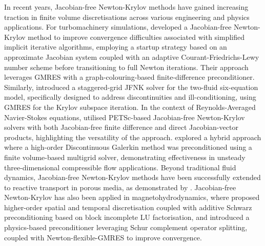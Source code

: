 \documentclass[sn-mathphys,Numbered]{sn-jnl}%
\begin{document}
In recent years, Jacobian-free Newton-Krylov methods have gained increasing traction in finite volume discretisations across various engineering and physics applications.
For turbomachinery simulations, \citet{Zhang2024} developed a Jacobian-free Newton-Krylov method to improve convergence difficulties associated with simplified implicit iterative algorithms, employing a startup strategy based on an approximate Jacobian system coupled with an adaptive Courant-Friedrichs-Lewy number scheme before transitioning to full Newton iterations.
Their approach leverages GMRES with a graph-colouring-based finite-difference preconditioner.
Similarly, \citet{Zhang2024twofluid} introduced a staggered-grid JFNK solver for the two-fluid six-equation model, specifically designed to address discontinuities and ill-conditioning, using GMRES for the Krylov subspace iteration.
In the context of Reynolds-Averaged Navier-Stokes equations, \citet{Sukas2025} utilised PETSc-based \citep{PETSc} Jacobian-free Newton-Krylov solvers with both Jacobian-free finite difference and direct Jacobian-vector products, highlighting the versatility of the approach.
\citet{Johannes2021} explored a hybrid approach where a high-order Discontinuous Galerkin method was preconditioned using a finite volume-based multigrid solver, demonstrating effectiveness in unsteady three-dimensional compressible flow applications.
Beyond traditional fluid dynamics, Jacobian-free Newton-Krylov methods have been successfully extended to reactive transport in porous media, as demonstrated by \citet{Amir2021}.
Jacobian-free Newton-Krylov has also been applied in magnetohydrodynamics, where 
\citet{Nguyen2022} proposed higher-order spatial and temporal discretisation coupled with additive Schwarz preconditioning based on block incomplete LU factorisation, and \citet{Chacon2025} introduced a physics-based preconditioner leveraging Schur complement operator splitting, coupled with Newton-flexible-GMRES to improve convergence.
\end{document}
